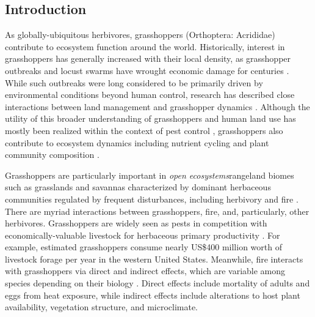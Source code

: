 \documentclass[referee, 
	            sn-basic]
           {sn-jnl}
\begin{document}
\maketitle
\begin{linenumbers}

\section{Introduction}

As globally-ubiquitous herbivores, grasshoppers (Orthoptera: Acrididae) contribute to ecosystem function around the world. 
Historically, interest in grasshoppers has generally increased with their local density, as grasshopper outbreaks and locust swarms have wrought economic damage for centuries \citep{cease2015}. 
While such outbreaks were long considered to be primarily driven by environmental conditions beyond human control, research has described close interactions between land management and grasshopper dynamics \citep{legall2019}. 
Although the utility of this broader understanding of grasshoppers and human land use has mostly been realized within the context of pest control \citep{branson2006}, grasshoppers also contribute to ecosystem dynamics including nutrient cycling and plant community composition \citep{meyer2002,zhang2011,kietzka2021}. 

Grasshoppers are particularly important in \emph{open ecosystems}\textemdash rangeland biomes such as grasslands and savannas characterized by dominant herbaceous communities regulated by frequent disturbances, including herbivory and fire \citep{bond2022}. 
There are myriad interactions between grasshoppers, fire, and, particularly, other herbivores. 
Grasshoppers are widely seen as pests in competition with economically-valuable livestock for herbaceous primary productivity \citep{zhang2019a}. 
For example, \citet{hewitt1983} estimated grasshoppers consume nearly US\$400 million worth of livestock forage per year in the western United States. 
Meanwhile, fire interacts with grasshoppers via direct and indirect effects, which are variable among species depending on their biology \citep[e.g.][]{vermeire2004}. 
Direct effects include mortality of adults and eggs from heat exposure, while indirect effects include alterations to host plant availability, vegetation structure, and microclimate. 


\end{linenumbers}
\end{document}
